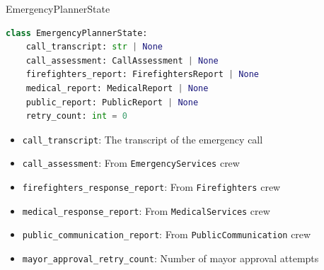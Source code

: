 \begin{frame}[fragile]{EmergencyPlannerState}
    \begin{lstlisting}[language=Python]
class EmergencyPlannerState:
    call_transcript: str | None
    call_assessment: CallAssessment | None
    firefighters_report: FirefightersReport | None
    medical_report: MedicalReport | None
    public_report: PublicReport | None
    retry_count: int = 0
    \end{lstlisting}
\begin{itemize}
    \item \texttt{call\_transcript}: The transcript of the emergency call
    \item \texttt{call\_assessment}: From \texttt{EmergencyServices} crew
    \item \texttt{firefighters\_response\_report}: From \texttt{Firefighters} crew
    \item \texttt{medical\_response\_report}: From \texttt{MedicalServices} crew
    \item \texttt{public\_communication\_report}: From \texttt{PublicCommunication} crew
    \item \texttt{mayor\_approval\_retry\_count}: Number of mayor approval attempts
\end{itemize}
\end{frame}
